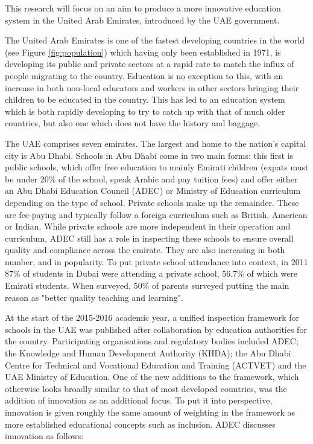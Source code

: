This research will focus on an aim to produce a more innovative education system in the United Arab Emirates, introduced by the UAE government.

The United Arab Emirates is one of the fastest developing countries in the world (see Figure \ref{fig:population}) which having only been established in 1971, is developing its public and private sectors at a rapid rate to match the influx of people migrating to the country. Education is no exception to this, with an increase in both non-local educators and workers in other sectors bringing their children to be educated in the country. This has led to an education system which is both rapidly developing to try to catch up with that of much older countries, but also one which does not have the history and baggage. 

The UAE comprises seven emirates. The largest and home to the nation's capital city is Abu Dhabi. Schools in Abu Dhabi come in two main forms: this first is public schools, which offer free education to mainly Emirati children (expats must be under 20\% of the school, speak Arabic and pay tuition fees) and offer either an Abu Dhabi Education Council (ADEC) or Ministry of Education curriculum depending on the type of school. Private schools make up the remainder. These are fee-paying and typically follow a foreign curriculum such as British, American or Indian. While private schools are more independent in their operation and curriculum, ADEC still has a role in inspecting these schools to ensure overall quality and compliance across the emirate. They are also increasing in both number, and in popularity. To put private school attendance into context, in 2011 87\% of students in Dubai were attending a private school, 56.7\% of which were Emirati students. \cite[p.16]{Kenaid2011} When surveyed, 50\% of parents surveyed putting the main reason as "better quality teaching and learning". \cite[p.16]{Kenaid2011}

At the start of the 2015-2016 academic year, a unified inspection framework for schools in the UAE was published after collaboration by education authorities for the country. Participating organisations and regulatory bodies included ADEC; the Knowledge and Human Development Authority (KHDA); the Abu Dhabi Centre for Technical and Vocational Education and Training (ACTVET) and the UAE Ministry of Education. One of the new additions to the framework, which otherwise looks broadly similar to that of most developed countries, was the addition of innovation as an additional focus. To put it into perspective, innovation is given roughly the same amount of weighting in the framework as more established educational concepts such as inclusion. ADEC discusses innovation as follows:

